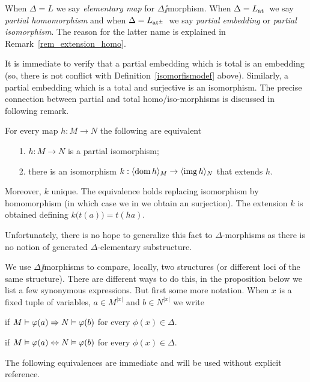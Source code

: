 \documentclass[creche.tex]{subfiles}
\begin{document}
When $\Delta=L$ we say \emph{elementary map\/} for $\Delta\jj$morphism. When  $\Delta=L_{\tiny\rm at}\hskip-.3ex\ $ we say  \emph{partial homomorphism\/} and when $\Delta=\atpmL\ $ we say \emph{partial embedding\/} or \emph{partial isomorphism}. The reason for the latter name is explained in Remark~\ref{rem_extension_homo}.

It is immediate to verify that a partial embedding which is total is an embedding (so, there is not conflict with Definition~\ref{isomorfismodef} above). Similarly, a partial embedding which is a total and surjective is an isomorphism. The precise connection between partial and total homo/iso-morphisms is discussed in following remark.


\begin{remark}\label{rem_extension_homo}
For every map  $h:M\to N$ the following are equivalent
\begin{itemize}
\item[1.] $h:M\to N$ is a partial isomorphism;
\item[2.] there is an isomorphism $k:\langle\mathop{\rm dom} h\rangle_M\to\langle\mathop{\rm img} h\rangle_N$ that extends $h$.
\end{itemize}
Moreover, $k$ unique. The equivalence holds replacing isomorphism by homomorphism (in which case we in  we obtain an surjection). The extension $k$ is obtained defining $k\big(t(a)\big)=t(ha)$.

Unfortunately, there is no hope to generalize this fact to $\Delta$-morphisms as there is no notion of generated $\Delta$-elementary substructure.\QED
\end{remark}


We use $\Delta\jj$morphisms to compare, locally, two structures (or different loci of the same structure). There are different ways to do this, in the proposition below we list a few synonymous expressions. But first some more notation. When $x$ is a fixed tuple of variables, $a\in M^{|x|}$ and $b\in N^{|x|}$ we write

\hfill if $M\vDash\varphi(a)\Rightarrow N\vDash\varphi(b)$ for every $\phi(x)\in\Delta$.

\hfill if $M\vDash\varphi(a)\Leftrightarrow N\vDash\varphi(b)$ for every $\phi(x)\in\Delta$.

The following equivalences are immediate and will be used without explicit reference.
\end{document}
